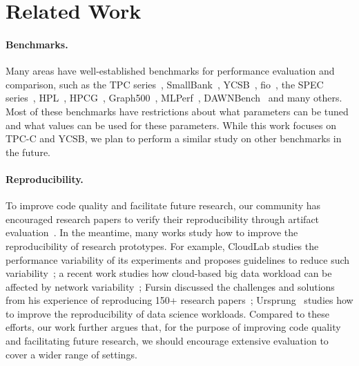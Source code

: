\section{Related Work}
  

\vspace{-.1in}
\paragraph{Benchmarks.}
Many areas have well-established benchmarks for performance evaluation and comparison,
such as the TPC series~\cite{tpcurl}, SmallBank~\cite{alomari2008cost}, YCSB~\cite{Cooper2010YCSB},
fio~\cite{fio-repo}, the SPEC series~\cite{specurl},
HPL~\cite{hplurl}, HPCG~\cite{hpcg}, Graph500~\cite{graph500url},
MLPerf~\cite{mlperf-train,mlperf-infer}, DAWNBench~\cite{DAWNBench} and many others.
Most of these benchmarks have restrictions about what parameters can be tuned and what values can be used
for these parameters.
While this work focuses on
TPC-C and YCSB, we plan to perform a similar study on other
benchmarks in the future.


\vspace{-.1in}
\paragraph{Reproducibility.} 
To improve code quality and facilitate future research, our community has encouraged
research papers to verify their reproducibility through artifact evaluation~\cite{osdi-repro,sosp-repro,eurosys-repro,vldb-repro,sigmod-repro}.
In the meantime, many works study how to improve the reproducibility of research
prototypes. For example, CloudLab studies the performance variability of its experiments
and proposes guidelines to reduce such variability~\cite{Maricq2018Variability};
a recent work studies how cloud-based big data workload can be affected by network variability~\cite{alex-nsdi20};
Fursin discussed the challenges and solutions from his experience of reproducing 150+ research
papers~\cite{fursin-2021};
Ursprung~\cite{lukas-vldb20} studies how to improve the reproducibility of data science workloads.
%
Compared to these efforts, our work further argues that, for the purpose of
improving code quality and facilitating future research, we should encourage
extensive evaluation to cover a wider range of settings.


